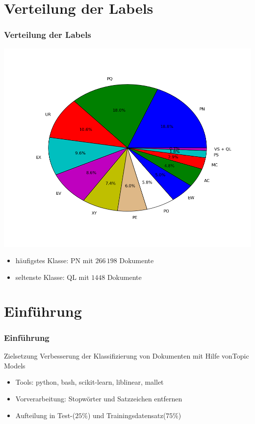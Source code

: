 \documentclass[12pt, xcolor=table]{beamer}
\begin{document}
\section{Verteilung der Labels}
\begin{frame}
    \frametitle{Verteilung der Labels}
    \begin{center}
        \includegraphics[scale=0.3]{figures/labels.png}
    \end{center}
    \begin{itemize}
        \item häufigstes Klasse: PN mit $266\, 198$ Dokumente
        \item seltenste Klasse: QL mit $1448$ Dokumente
    \end{itemize}
\end{frame}

\section{Einführung}
\begin{frame}
    \frametitle{Einführung}
    \begin{block}{Zielsetzung}
        Verbesserung der Klassifizierung von Dokumenten mit Hilfe vonTopic Models
    \end{block}
    \begin{itemize}
        \item  Tools: python, bash, scikit-learn, liblinear, mallet
        \item  Vorverarbeitung: Stopwörter und Satzzeichen entfernen
        \item  Aufteilung in Test-($25 \%$) und Trainingsdatensatz($75 \%$)
    \end{itemize}
\end{frame}
\end{document}
